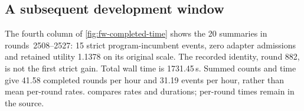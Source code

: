 \subsection{A subsequent development window}\label{app:subsequent-window}\label{app:subsequent-utility}\label{app:subsequent-rates}

The fourth column of \cref{fig:fw-completed-time} shows the 20 summaries
in rounds~2508--2527: 15 strict program-incumbent events, zero adapter
admissions and retained utility \num{1.1378} on its original scale. The recorded
identity, round 882, is not the first strict gain. Total wall time is
\num{1731.45}\,s. Summed counts and time give 41.58 completed rounds per hour
and 31.19 events per hour, rather than mean per-round rates.
 compares rates and durations; per-round
times remain in the source.
